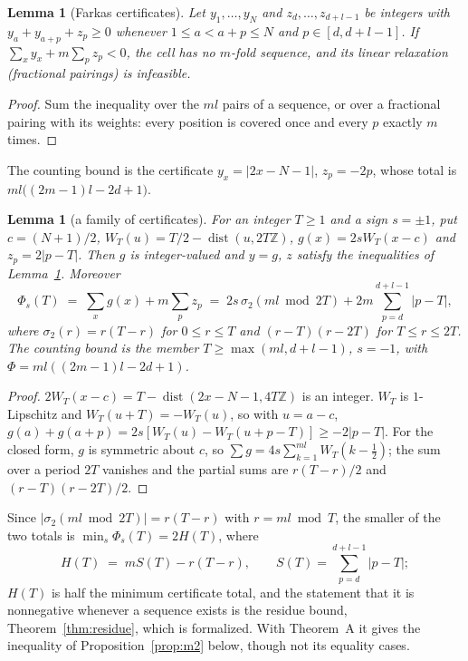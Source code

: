 \documentclass[11pt]{amsart}
\theoremstyle{plain}
\newtheorem{lemma}[theorem]{Lemma}
\theoremstyle{definition}
\theoremstyle{remark}
\newcommand{\Z}{\mathbb{Z}}
\begin{document}
\begin{lemma}[Farkas certificates]\label{lem:farkas}
Let $y_1,\dots,y_N$ and $z_d,\dots,z_{d+l-1}$ be integers with
$y_a + y_{a+p} + z_p \ge 0$ whenever $1 \le a < a + p \le N$ and $p \in [d,d+l-1]$. If
$\sum_x y_x + m \sum_p z_p < 0$, the cell has no $m$-fold sequence, and its linear
relaxation (fractional pairings) is infeasible.
\end{lemma}

\begin{proof}
Sum the inequality over the $ml$ pairs of a sequence, or over a fractional pairing with
its weights: every position is covered once and every $p$ exactly $m$ times.
\end{proof}

The counting bound is the certificate $y_x = |2x - N - 1|$, $z_p = -2p$, whose total is
$ml\bigl((2m-1)l - 2d + 1\bigr)$.

\begin{lemma}[a family of certificates]\label{lem:familyP}
For an integer $T \ge 1$ and a sign $s = \pm 1$, put $c = (N+1)/2$,
$W_T(u) = T/2 - \operatorname{dist}(u, 2T\Z)$, $g(x) = 2sW_T(x - c)$ and
$z_p = 2|p - T|$. Then $g$ is integer-valued and $y = g$, $z$ satisfy the inequalities of
Lemma~\ref{lem:farkas}. Moreover
\[
  \Phi_s(T) \;=\; \sum_x g(x) + m\sum_p z_p
  \;=\; 2s\,\sigma_2(ml \bmod 2T) + 2m \sum_{p=d}^{d+l-1} |p - T|,
\]
where $\sigma_2(r) = r(T-r)$ for $0 \le r \le T$ and $(r-T)(r-2T)$ for
$T \le r \le 2T$. The counting bound is the member $T \ge \max(ml, d+l-1)$, $s = -1$,
with $\Phi = ml((2m-1)l - 2d + 1)$.
\end{lemma}

\begin{proof}
$2W_T(x-c) = T - \operatorname{dist}(2x-N-1, 4T\Z)$ is an integer. $W_T$ is
$1$-Lipschitz and $W_T(u+T) = -W_T(u)$, so with $u = a - c$,
$g(a) + g(a+p) = 2s[W_T(u) - W_T(u+p-T)] \ge -2|p-T|$. For the closed form, $g$ is
symmetric about $c$, so $\sum g = 4s\sum_{k=1}^{ml} W_T(k-\tfrac12)$; the sum over a
period $2T$ vanishes and the partial sums are $r(T-r)/2$ and $(r-T)(r-2T)/2$.
\end{proof}

Since $|\sigma_2(ml \bmod 2T)| = r(T-r)$ with $r = ml \bmod T$, the smaller of the two
totals is $\min_s \Phi_s(T) = 2H(T)$, where
\[
  H(T) \;=\; mS(T) - r(T-r), \qquad S(T) = \sum_{p=d}^{d+l-1} |p - T| ;
\]
$H(T)$ is half the minimum certificate total, and the statement that it is nonnegative
whenever a sequence exists is the residue bound, Theorem~\ref{thm:residue}, which is
formalized. With Theorem~A it gives the inequality of Proposition~\ref{prop:m2} below,
though not its equality cases.
\end{document}
